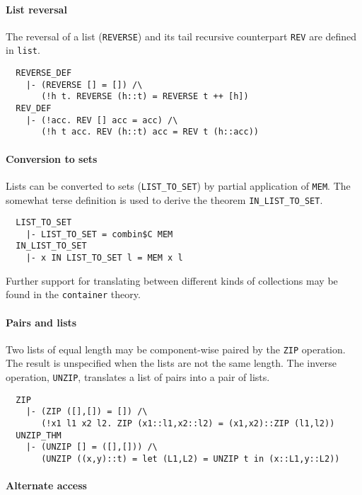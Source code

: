 \paragraph {List reversal}

The reversal of a list ({\small\verb+REVERSE+}) and its tail recursive counterpart
{\small\verb+REV+} are defined in {\small\verb+list+}.
{\small
\begin{verbatim}
  REVERSE_DEF
    |- (REVERSE [] = []) /\
       (!h t. REVERSE (h::t) = REVERSE t ++ [h])
  REV_DEF
    |- (!acc. REV [] acc = acc) /\
       (!h t acc. REV (h::t) acc = REV t (h::acc))
\end{verbatim}}

\paragraph {Conversion to sets}

Lists can be converted to sets ({\small\verb+LIST_TO_SET+}) by
partial application of {\small\verb+MEM+}. The somewhat
terse definition is used to derive the theorem
{\small\verb+IN_LIST_TO_SET+}.
%
{\small
\begin{verbatim}
  LIST_TO_SET
    |- LIST_TO_SET = combin$C MEM
  IN_LIST_TO_SET
    |- x IN LIST_TO_SET l = MEM x l
\end{verbatim}}
%
Further support for translating between different kinds of
collections may be found in the {\small\verb+container+} theory.

\paragraph {Pairs and lists}

Two lists of equal length may be component-wise paired by
the {\small\verb+ZIP+} operation. The result is unspecified
when the lists are not the same length. The inverse operation,
{\small\verb+UNZIP+}, translates a list of pairs into a pair of
lists.
%
{\small
\begin{verbatim}
  ZIP
    |- (ZIP ([],[]) = []) /\
       (!x1 l1 x2 l2. ZIP (x1::l1,x2::l2) = (x1,x2)::ZIP (l1,l2))
  UNZIP_THM
    |- (UNZIP [] = ([],[])) /\
       (UNZIP ((x,y)::t) = let (L1,L2) = UNZIP t in (x::L1,y::L2))
\end{verbatim}}

\paragraph {Alternate access}

